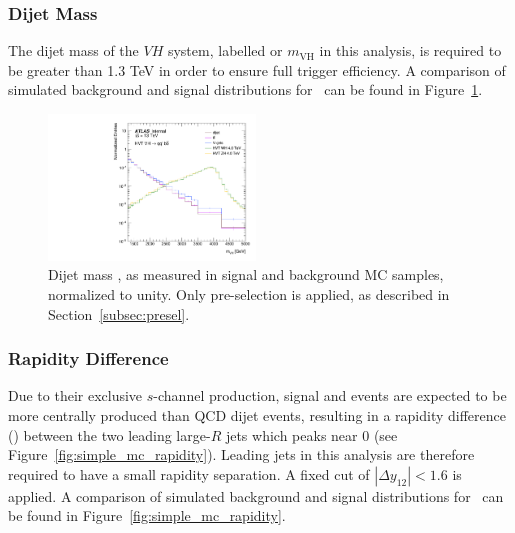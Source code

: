 \subsubsection{Dijet Mass}
The dijet mass of the $VH$ system, labelled \mvh or $m_{\mathrm{VH}}$ in this analysis, is required to be greater than 1.3 TeV in order to ensure full trigger efficiency.
A comparison of simulated background and signal distributions for \mvh\ can be found in Figure~\ref{fig:simple_mc_mVH}.

\begin{figure}[htbp!]
\begin{center}
    \includegraphics[width=0.49\textwidth]{Ch5_VHqqbb/figures/VHqqbb_SimpleSigBkgMC_mVH.pdf}
\end{center}
\caption{Dijet mass \mvh, as measured in signal and background MC samples, normalized to unity.
Only pre-selection is applied, as described in Section~\ref{subsec:presel}.}
\label{fig:simple_mc_mVH}
\end{figure}

\subsubsection{Rapidity Difference}
Due to their exclusive $s$-channel production, signal \wpwh and \zpzh events are expected to be more centrally produced than QCD dijet events, resulting in a rapidity difference () between the two leading large-$R$ jets which peaks near 0 (see Figure~\ref{fig:simple_mc_rapidity}).
Leading jets in this analysis are therefore required to have a small rapidity separation. A fixed cut of $|\Delta{y}_{12}|<1.6$ is applied.
A comparison of simulated background and signal distributions for \ can be found in Figure~\ref{fig:simple_mc_rapidity}.


